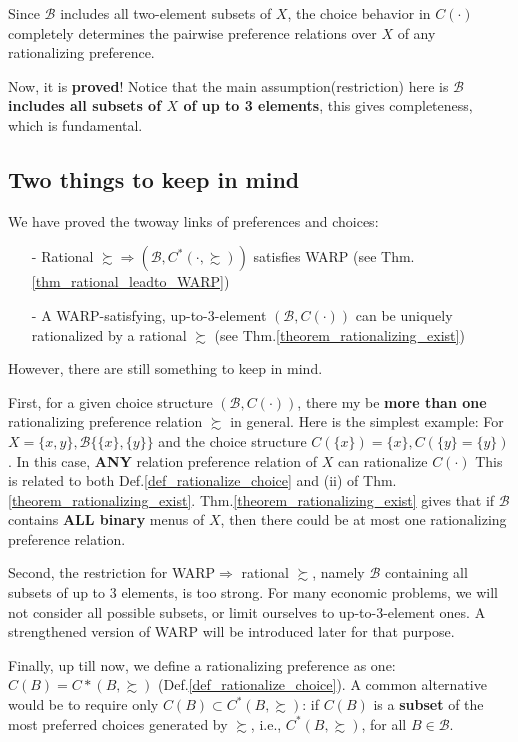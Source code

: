\begin{enumerate}
    Since $\mathcal{B}$ includes all two-element subsets of $X$, the choice behavior in $C(\cdot)$ completely determines the pairwise preference relations over $X$ of any rationalizing preference.
\end{enumerate}

Now, it is \textbf{proved}! Notice that the main assumption(restriction) here is \textbf{$\mathcal{B}$ includes all subsets of $X$ of up to 3 elements}, this gives completeness, which is fundamental.

\subsection*{Two things to keep in mind}
We have proved the twoway links of preferences and choices:
\begin{enumerate}
    \item[-] Rational $\succsim\Rightarrow (\mathcal{B},C^*(\cdot,\succsim))$ satisfies WARP (see Thm.\ref{thm_rational_leadto_WARP})
    \item[-] A WARP-satisfying, up-to-3-element $(\mathcal{B},C(\cdot))$ can be uniquely rationalized by a rational $\succsim$ (see Thm.\ref{theorem_rationalizing_exist})
\end{enumerate}
However, there are still something to keep in mind.

First, for a given choice structure $(\mathcal{B},C(\cdot))$, there my be \textbf{more than one} rationalizing preference relation $\succsim$ in general. Here is the simplest example:
For $X=\{x,y\},\mathcal{B}\{\{x\},\{y\}\}$ and the choice structure $C(\{x\})=\{x\}, C(\{y\}=\{y\})$. In this case, \textbf{ANY} relation preference relation of $X$ can rationalize $C(\cdot)$
This is related to both Def.\ref{def_rationalize_choice} and (ii) of Thm.\ref{theorem_rationalizing_exist}. Thm.\ref{theorem_rationalizing_exist} gives that if $\mathcal{B}$ contains \textbf{ALL binary} menus of $X$,
then there could be at most one rationalizing preference relation.

Second, the restriction for WARP$\Rightarrow$ rational $\succsim$, namely $\mathcal{B}$ containing all subsets of up to 3 elements, is too strong. For many economic problems, we will not consider all possible subsets, or limit ourselves to up-to-3-element ones. A strengthened version of WARP will be introduced later for that purpose.

Finally, up till now, we define a rationalizing preference as one: $C(B)=C*(B,\succsim)$ (Def.\ref{def_rationalize_choice}). A common alternative would be to require only $C(B)\subset C^*(B,\succsim)$: if $C(B)$ is a \textbf{subset} of the most preferred choices generated by $\succsim$, i.e., $C^*(B,\succsim)$, for all $B\in\mathcal{B}$.